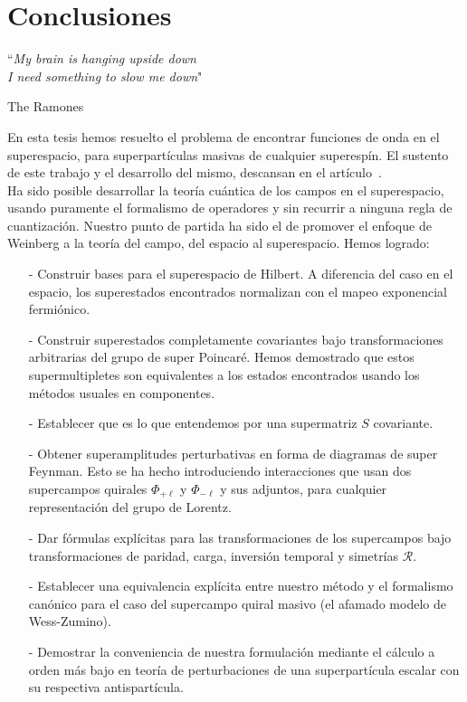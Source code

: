\chapter{Conclusiones}
\label{Chap:Conclusiones}
\epigraph{``\textit{My brain is hanging upside down\\
             I need something to slow me down}"}{The Ramones}


En esta tesis hemos resuelto el problema de encontrar funciones de onda en el superespacio, para superpartículas  masivas de cualquier superespín. El sustento de este trabajo  y el desarrollo del mismo, descansan en el artículo~\cite{Jimenez:2014gfa}.\\

Ha sido posible desarrollar la teoría cuántica de los campos en el superespacio, usando puramente el formalismo de operadores y sin recurrir a ninguna regla de cuantización. Nuestro punto de partida ha sido el de promover  el enfoque de Weinberg a la teoría del campo, del espacio al superespacio.   Hemos logrado:
\begin{itemize}
\item[-] Construir bases para el superespacio de Hilbert. A diferencia del caso en el espacio, los superestados encontrados normalizan con el mapeo exponencial fermiónico. 
\item[-] Construir superestados completamente covariantes bajo transformaciones arbitrarias del grupo de super Poincaré. Hemos demostrado que estos supermultipletes son equivalentes a los estados encontrados usando los métodos usuales en componentes.
\item[-] Establecer  que es lo que entendemos por una supermatriz $ S $ covariante. 
\item[-] Obtener superamplitudes perturbativas en forma de  diagramas de super Feynman. Esto se ha hecho introduciendo interacciones que usan dos supercampos quirales $ \Phi_{+\ell} $ y  $ \Phi_{-\ell} $ y sus adjuntos, para cualquier representación del grupo de Lorentz.
\item[-] Dar fórmulas explícitas para  las transformaciones de los supercampos bajo transformaciones de paridad, carga, inversión temporal y simetrías $ \mathcal{R} $.
\item[-] Establecer una equivalencia explícita entre nuestro método y el formalismo canónico para el caso del supercampo quiral masivo (el afamado modelo de Wess-Zumino).
\item[-] Demostrar la conveniencia de nuestra formulación mediante el cálculo a orden más bajo  en teoría de perturbaciones de una superpartícula escalar con su respectiva antispartícula.
\end{itemize}
